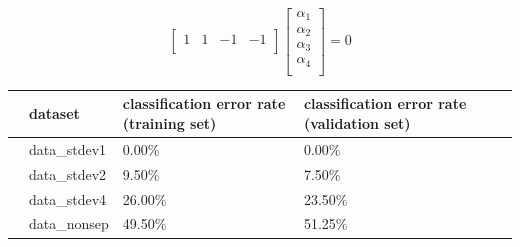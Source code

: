 \documentclass[10pt]{article}
\begin{document}
\[
\begin{bmatrix}
    1 & 1 & -1 & -1 \\
\end{bmatrix}
\begin{bmatrix}
    \alpha_1 \\
    \alpha_2 \\
    \alpha_3 \\
    \alpha_4 \\
\end{bmatrix} 
= 0
\]

\begin{table}
\begin{tabular}{llllll}
\toprule
{} & dataset & classification error rate (training set) & classification error rate (validation set) \\
\midrule
  & data\_stdev1 & 0.00\% & 0.00\% \\
  & data\_stdev2 & 9.50\% & 7.50\% \\
  & data\_stdev4 & 26.00\% & 23.50\% \\
  & data\_nonsep & 49.50\% & 51.25\% \\
\bottomrule
\end{tabular}
\end{table}
\end{document}
